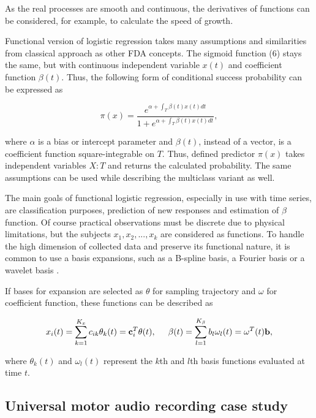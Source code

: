 \documentclass[energies,article,submit,pdftex,moreauthors]{Definitions/mdpi}
\begin{document}
As the real processes are smooth and continuous, the derivatives of functions can be considered, for example, to calculate the speed of growth.

\vspace{5mm}
Functional version of logistic regression takes many assumptions and similarities from classical approach as other FDA concepts. The sigmoid function (6) stays the same, but with continuous independent variable $ x(t) $ and coefficient function $ \beta(t)$. Thus, the following form of conditional success probability can be expressed as
\begin{linenomath}
\begin{equation}
\pi(x) = \frac{e^{\alpha + \int_T \beta(t)x(t)dt}}{1 + e^{\alpha + \int_T \beta(t)x(t)dt}},
\end{equation}
\end{linenomath}
where $\alpha$ is a bias or intercept parameter and $\beta(t)$, instead of a vector, is a coefficient function square-integrable on $T$. Thus, defined predictor $\pi(x)$ takes independent variables $X : T$ and returns the calculated probability. The same assumptions can be used while describing the multiclass variant as well. 

The main goals of functional logistic regression, especially in use with time series, are classification purposes, prediction of new responses and estimation of $\beta$ function. Of course practical observations must be discrete due to physical limitations, but the subjects $x_1, x_2, ..., x_k$ are considered as functions. To handle the high dimension of collected data and preserve its functional nature, it is common to use a basis expansions, such as a B-spline basis, a Fourier basis or a wavelet basis \cite{logreg-comparison}. 

If bases for expansion are selected as $\theta$ for sampling trajectory and $\omega$ for coefficient function, these functions can be described as
\begin{linenomath}
\begin{equation}
x_i(t) = \sum_{k=1}^{K_x} c_{ik} \theta_k (t) = {\bf c}_i^T \theta (t),
\hspace{5mm} \beta(t) = \sum_{l=1}^{K_{\beta}} b_l \omega_l (t) = \omega^T (t) {\bf b},
\end{equation}
\end{linenomath}
where $\theta_k (t)$ and $\omega_l (t)$ represent the $k$th and $l$th basis functions evaluated at time $t$.

\subsection{Universal motor audio recording case study}
\end{document}
